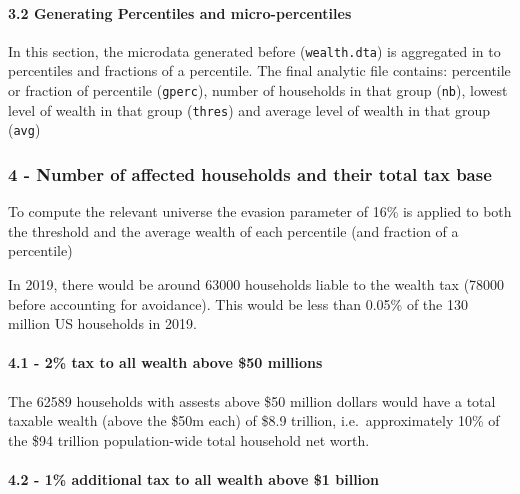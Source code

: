 \documentclass[]{article}
\let\oldparagraph\paragraph
\renewcommand{\paragraph}[1]{\oldparagraph{#1}\mbox{}}
\begin{document}
\hypertarget{generating-percentiles-and-micro-percentiles}{%
\paragraph{3.2 Generating Percentiles and
micro-percentiles}\label{generating-percentiles-and-micro-percentiles}}

In this section, the microdata generated before (\texttt{wealth.dta}) is
aggregated in to percentiles and fractions of a percentile. The final
analytic file contains: percentile or fraction of percentile
(\texttt{gperc}), number of households in that group (\texttt{nb}),
lowest level of wealth in that group (\texttt{thres}) and average level
of wealth in that group (\texttt{avg})

\hypertarget{number-of-affected-households-and-their-total-tax-base}{%
\subsubsection{4 - Number of affected households and their total tax
base}\label{number-of-affected-households-and-their-total-tax-base}}

To compute the relevant universe the evasion parameter of 16\% is
applied to both the threshold and the average wealth of each percentile
(and fraction of a percentile)

In 2019, there would be around 63000 households liable to the wealth tax
(78000 before accounting for avoidance). This would be less than 0.05\%
of the 130 million US households in 2019.

\hypertarget{tax-to-all-wealth-above-50-millions}{%
\paragraph{4.1 - 2\% tax to all wealth above \$50
millions}\label{tax-to-all-wealth-above-50-millions}}

The 62589 households with assests above \$50 million dollars would have
a total taxable wealth (above the \$50m each) of \$8.9 trillion,
i.e.~approximately 10\% of the \$94 trillion population-wide total
household net worth.

\hypertarget{additional-tax-to-all-wealth-above-1-billion}{%
\paragraph{4.2 - 1\% additional tax to all wealth above \$1
billion}\label{additional-tax-to-all-wealth-above-1-billion}}
\end{document}

